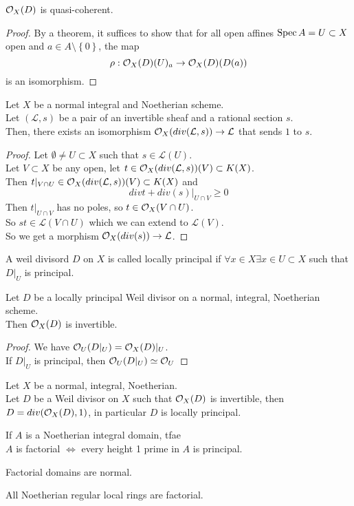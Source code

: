 \documentclass[../main.tex]{subfiles}
\begin{document}
\begin{lemma}
$\mathcal{O}_X( D) $ is quasi-coherent.
\end{lemma}
\begin{proof}
By a theorem, it suffices to show that for all open affines $\operatorname{Spec} A = U \subset X$ open and $a \in A \setminus \left\{ 0 \right\} $, the map
\[ 
\rho: \mathcal{O}_X( D) ( U)_a \to \mathcal{O}_X( D) ( D( a) ) 
\]
is an isomorphism.
\end{proof}
\begin{propo}
Let $X$ be a normal integral and Noetherian scheme.\\
Let $ ( \mathcal{L},s) $ be a pair of an invertible sheaf and a rational section $s$.\\
Then, there exists an isomorphism $\mathcal{O}_X( div( \mathcal{L},s) ) \to \mathcal{L}$ that sends $1$ to $s$.
\end{propo}
\begin{proof}
Let $\emptyset \neq U \subset X$ such that $ s\in \mathcal{L}( U) $.\\
Let $V \subset X$ be any open, let $t \in\mathcal{O}_X( div(  \mathcal{L},s) ) ( V) \subset K( X) $.\\
Then $t|_{V\cap U} \in \mathcal{O}_X( div(  \mathcal{L},s) ) ( V) \subset K( X) $ and
\[ 
div t + div( s) |_{U\cap V}  \geq 0
\]
Then $t|_{U\cap V} $ has no poles, so $t\in \mathcal{O}_X( V\cap U) $.\\
So $st \in \mathcal{L}( V\cap U) $ which we can extend to $ \mathcal{L}( V) $.\\
So we get a morphism $\mathcal{O}_X( div( s) ) \to \mathcal{L}$.
\end{proof}
\begin{defn}
	A weil divisord $D$ on $X$ is called locally principal if $\forall x \in X\exists x\in U \subset X$ such that $D|_U$ is principal.
\end{defn}
\begin{crly}
Let $D$ be a locally principal Weil divisor on a normal, integral, Noetherian scheme.\\
Then $\mathcal{O}_X( D) $ is invertible.
\end{crly}
\begin{proof}
	We have $\mathcal{O}_U( D|_U) = \mathcal{O}_X( D) |_U$.\\
	If $D|_U$ is principal, then $\mathcal{O}_U( D|_U) \simeq \mathcal{O}_U$ 
\end{proof}
\begin{propo}
Let $X$ be a normal, integral, Noetherian.\\
Let $D$ be a Weil divisor on $X$ such that $\mathcal{O}_X( D)$ is invertible, then $D= div( \mathcal{O}_X( D),1 ) $, in particular $D$ is locally principal.
\end{propo}
\begin{propo}
If $A$ is a Noetherian integral domain, tfae\\
$A$ is factorial $\iff$ every height 1 prime in $A$ is principal.
\end{propo}
\begin{propo}
Factorial domains are normal.
\end{propo}
\begin{thm}
	All Noetherian regular local rings are factorial.
\end{thm}
\end{document}
